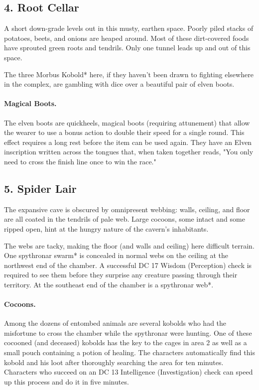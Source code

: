 \documentclass[10pt,a4paper,twoside,twocolumn,openany,bg=print,nodeprecatedcode]{dndbook}
\begin{document}
\subsection{4. Root Cellar}
\begin{DndReadAloud}{}
A short down-grade levels out in this musty, earthen space. Poorly piled stacks of potatoes, beets, and onions are heaped around. Most of these dirt-covered foods have sprouted green roots and tendrils. Only one tunnel leads up and out of this space.
\end{DndReadAloud}

The three Morbus Kobold* here, if they haven't been drawn to fighting elsewhere in the complex, are gambling with dice over a beautiful pair of elven boots.
\paragraph{Magical Boots.}
The elven boots are quickheels, magical boots (requiring attunement) that allow the wearer to use a bonus action to double their speed for a single round. This effect requires a long rest before the item can be used again. They have an Elven inscription written across the tongues that, when taken together reads, "You only need to cross the finish line once to win the race."
\subsection{5. Spider Lair}
\begin{DndReadAloud}{}
The expansive cave is obscured by omnipresent webbing: walls, ceiling, and floor are all coated in the tendrils of pale web. Large cocoons, some intact and some ripped open, hint at the hungry nature of the cavern's inhabitants.
\end{DndReadAloud}

The webs are tacky, making the floor (and walls and ceiling) here difficult terrain. One spythronar swarm* is concealed in normal webs on the ceiling at the northwest end of the chamber. A successful DC 17 Wisdom (Perception) check is required to see them before they surprise any creature passing through their territory. At the southeast end of the chamber is a spythronar web*.
\paragraph{Cocoons.}
Among the dozens of entombed animals are several kobolds who had the misfortune to cross the chamber while the spythronar were hunting. One of these cocooned (and deceased) kobolds has the key to the cages in area 2 as well as a small pouch containing a potion of healing. The characters automatically find this kobold and his loot after thoroughly searching the area for ten minutes. Characters who succeed on an DC 13 Intelligence (Investigation) check can speed up this process and do it in five minutes.
\end{document}
